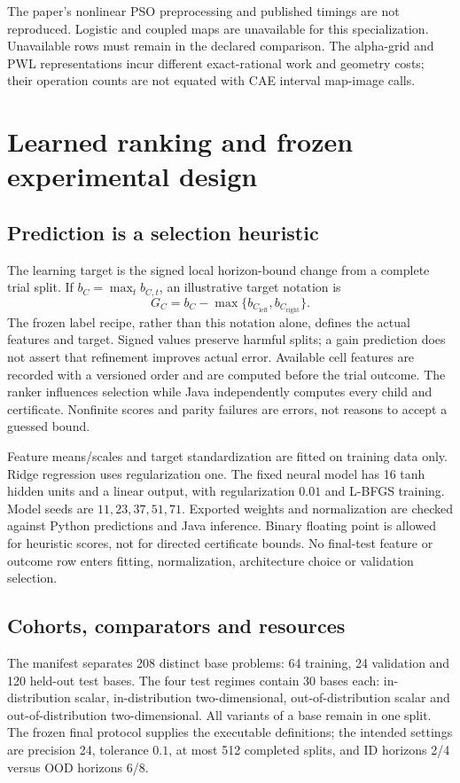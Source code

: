 \documentclass[10pt,a4paper]{article}
\begin{document}
The paper's nonlinear PSO preprocessing and published timings are not
reproduced. Logistic and coupled maps are unavailable for this specialization.
Unavailable rows must remain in the declared comparison. The alpha-grid and
PWL representations incur different exact-rational work and geometry costs;
their operation counts are not equated with CAE interval map-image calls.

\section{Learned ranking and frozen experimental design}
\subsection{Prediction is a selection heuristic}
The learning target is the signed local horizon-bound change from a complete
trial split. If $b_C=\max_t b_{C,t}$, an illustrative target notation is
\[
 G_C=b_C-\max\{b_{C_\mathrm{left}},b_{C_\mathrm{right}}\}.
\]
The frozen label recipe, rather than this notation alone, defines the actual
features and target. Signed values preserve harmful splits; a gain prediction
does not assert that refinement improves actual error. Available cell features
are recorded with a versioned order and are computed before the trial outcome.
The ranker influences selection while Java independently computes every child
and certificate. Nonfinite scores and parity failures are errors, not reasons
to accept a guessed bound.

Feature means/scales and target standardization are fitted on training data
only. Ridge regression uses regularization one. The fixed neural model has
16 tanh hidden units and a linear output, with regularization $0.01$ and
L-BFGS training. Model seeds are $11,23,37,51,71$. Exported weights and
normalization are checked against Python predictions and Java inference.
Binary floating point is allowed for heuristic scores, not for directed
certificate bounds. No final-test feature or outcome row enters fitting,
normalization, architecture choice or validation selection.

\subsection{Cohorts, comparators and resources}
The manifest separates 208 distinct base problems: 64 training, 24 validation
and 120 held-out test bases. The four test regimes contain 30 bases each:
in-distribution scalar, in-distribution two-dimensional, out-of-distribution
scalar and out-of-distribution two-dimensional. All variants of a base remain
in one split. The frozen final protocol supplies the executable definitions;
the intended settings are precision 24, tolerance $0.1$, at most 512 completed
splits, and ID horizons 2/4 versus OOD horizons 6/8.
\end{document}
